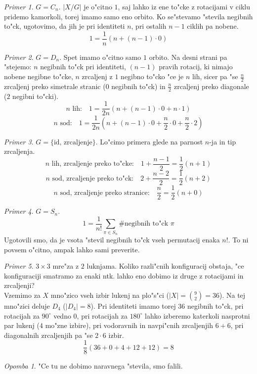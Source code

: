 \documentclass[a4paper,12pt]{article}
\theoremstyle{definition}
\theoremstyle{remark}
\newtheorem*{ex}{Primer}
\newtheorem*{rem}{Opomba}
\begin{document}
\begin{ex}
	$G=C_n$. $|X/G|$ je o"citno $1$, saj lahko iz ene to"cke z rotacijami v ciklu pridemo kamorkoli, torej imamo samo eno orbito. Ko se"stevamo "stevila negibnih to"ck, ugotovimo, da jih je pri identiteti $n$, pri ostalih $n-1$ ciklih pa nobene.
	$$1 = \frac{1}{n}(n + (n-1)\cdot 0)$$
\end{ex}
\begin{ex}
	$G=D_n$. Spet imamo o"citno samo $1$ orbito. Na desni strani pa "stejemo: $n$ negibnih to"ck pri identiteti, $(n-1)$ pravih rotacij, ki nimajo nobene negibne to"cke, $n$ zrcaljenj z $1$ negibno to"cko "ce je $n$ lih, sicer pa "se $\frac{n}{2}$ zrcaljenj preko simetrale stranic ($0$ negibnih to"ck) in $\frac{n}{2}$ zrcaljenj preko diagonale ($2$ negibni to"cki).
	$$n\text{ lih:} \quad 1 = \frac{1}{2n}(n + (n-1)\cdot 0 + n \cdot 1)$$
	$$n\text{ sod:} \quad 1 = \frac{1}{2n}(n + (n-1)\cdot 0 + \frac{n}{2} \cdot 0 + \frac{n}{2} \cdot 2)$$
\end{ex}
\begin{ex}
	$G = \lbrace \text{id, zrcaljenje} \rbrace$. Lo"cimo primera glede na parnost $n$-ja in tip zrcaljenja.
	$$n\text{ lih, zrcaljenje preko to"cke:}\quad 1 + \frac{n-1}{2} = \frac{1}{2}(n+1)$$
	$$n\text{ sod, zrcaljenje preko to"ck:}\quad 2 + \frac{n-2}{2} = \frac{1}{2}(n+2)$$
	$$n\text{ sod, zrcaljenje preko stranice:}\quad \frac{n}{2} = \frac{1}{2}(n+0)$$
\end{ex}
\begin{ex}
	$G = S_n$.
	$$1 = \frac{1}{n!}\sum_{\pi \in S_n} \# \text{negibnih to"ck }\pi$$
	Ugotovili smo, da je vsota "stevil negibnih to"ck vseh permutacij enaka $n!$. To ni povsem o"citno, ampak lahko sami preverite.
\end{ex}
\begin{ex}
	$3 \times 3$ mre"za z $2$ luknjama. Koliko razli"cnih konfiguracij obstaja, "ce konfiguraciji smatramo za enaki ntk. lahko eno dobimo iz druge z rotacijami in zrcaljenji?
	\\
	Vzemimo za $X$ mno"zico vseh izbir lukenj na plo"s"ci ($|X|=\binom{9}{2}=36$). Na tej mno"zici deluje $D_4$ ($|D_4| = 8$). Pri identiteti imamo torej $36$ negibnih to"ck, pri rotacijah za $90^{\circ}$ vedno $0$, pri rotacijah za $180^{\circ}$ lahko izberemo katerkoli nasprotni par lukenj ($4$ mo"zne izbire), pri vodoravnih in navpi"cnih zrcaljenjih $6 + 6$, pri diagonalnih zrcaljenjih pa "se $2 \cdot 6$ izbir.
	$$\frac{1}{8}(36+0+4+12+12)=8$$
	\begin{rem}
		"Ce tu ne dobimo naravnega "stevila, smo falili.
	\end{rem}
\end{ex}
\end{document}
